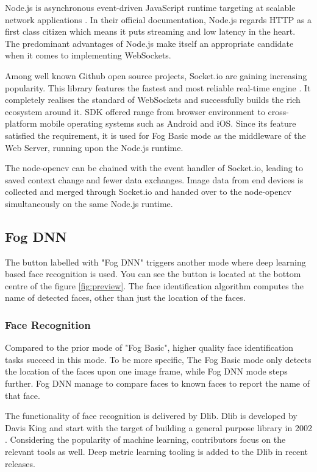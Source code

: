 Node.js is asynchronous event-driven JavaScript runtime targeting at scalable network applications \cite{nodejs}. In their official documentation, Node.js regards HTTP as a first class citizen which means it puts streaming and low latency in the heart. The predominant advantages of Node.js make itself an appropriate candidate when it comes to implementing WebSockets.

Among well known Github open source projects, Socket.io are gaining increasing popularity. This library features the fastest and most reliable real-time engine \cite{socketio}. It completely realises the standard of WebSockets and successfully builds the rich ecosystem around it. SDK offered range from browser environment to cross-platform mobile operating systems such as Android and iOS. Since its feature satisfied the requirement, it is used for Fog Basic mode as the middleware of the Web Server, running upon the Node.js runtime.

The node-opencv can be chained with the event handler of Socket.io, leading to saved context change and fewer data exchanges. Image data from end devices is collected and merged through Socket.io and handed over to the node-opencv simultaneously on the same Node.js runtime. 

\subsection{Fog DNN}
The button labelled with "Fog DNN" triggers another mode where deep learning based face recognition is used. You can see the button is located at the bottom centre of the figure \ref{fig:preview}.
The face identification algorithm computes the name of detected faces, other than just the location of the faces.  

\subsubsection{Face Recognition}
Compared to the prior mode of "Fog Basic", higher quality face identification tasks succeed in this mode. To be more specific, The Fog Basic mode only detects the location of the faces upon one image frame, while Fog DNN mode steps further. Fog DNN manage to compare faces to known faces to report the name of that face.

The functionality of face recognition is delivered by Dlib. Dlib is developed by Davis King and start with the target of building a general purpose library in 2002 \cite{dlib09}. Considering the popularity of machine learning, contributors focus on the relevant tools as well. Deep metric learning tooling is added to the Dlib in recent releases.

